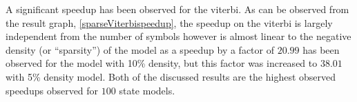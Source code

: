 A significant speedup has been observed for the \gls{viterbi}. As can be observed from the result graph, \ref{sparseViterbispeedup}, the speedup on the \gls{viterbi} is largely independent from the number of symbols however is almost linear to the negative density (or ``sparsity'') of the model as a speedup by a factor of $20.99$ has been observed for the model with 10\% density, but this factor was increased to $38.01$ with 5\% density model. Both of the discussed results are the highest observed speedups observed for $100$ state models.